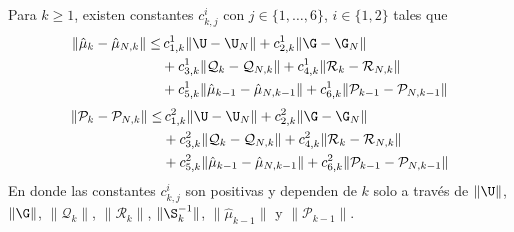 \begin{prop}
	Para $k \geq 1$, existen constantes $c_{k,j}^i$ con $j \in \{ 1, \dots, 6\}$, $i \in \{ 1, 2\}$ tales que
	\begin{equation*}
		\begin{aligned}
			\| \hat \mu_{k} - \hat \mu_{N,k}  \| \leq & \, c_{1,k}^1 \| \U - \U_N \| +  c_{2,k}^1 \| \G - \G_N \| \\ 
			&+ c_{3,k}^1 \| \mathcal{Q}_{k} - \mathcal{Q}_{N, k} \| +c_{4,k}^1 \| \mathcal{R}_{k} - \mathcal{R}_{N, k} \| \\
			& + c_{5,k}^1 \| \hat \mu_{k-1} - \hat \mu_{N, k-1} \| + c_{6,k}^1 \| \mathcal{P}_{k-1} - \mathcal{P}_{N, k-1} \|
		\end{aligned}
	\end{equation*}
	\begin{equation*}
		\begin{aligned}
			\| \mathcal{P}_{k} - \mathcal{P}_{N,k} \| \leq & \, c_{1,k}^2 \| \U - \U_N \| +  c_{2,k}^2 \| \G - \G_N \| \\ 
			&+ c_{3,k}^2 \| \mathcal{Q}_{k} - \mathcal{Q}_{N, k} \| +c_{4,k}^2 \| \mathcal{R}_{k} - \mathcal{R}_{N, k} \| \\
			& + c_{5,k}^2 \| \hat \mu_{k-1} - \hat \mu_{N, k-1} \| + c_{6,k}^2 \| \mathcal{P}_{k-1} - \mathcal{P}_{N, k-1} \|
		\end{aligned}
	\end{equation*}
	En donde las constantes $c_{k,j}^i$ son positivas y dependen de $k$ solo a través de $\| \U \| $, $\| \G \| $, $\| \mathcal{Q}_{k} \| $, $\| \mathcal{R}_{k} \| $, $\| \S_{k}^{-1} \| $, $\| \hat{\mu}_{k-1} \| $ y $\| \mathcal{P}_{k-1} \| $.
\end{prop}



